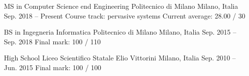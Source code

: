 

\begin{cventries}

\cventry
    {MS in Computer Science end Engineering}
    {Politecnico di Milano}
    {Milano, Italia}
    {Sep. 2018 -- Present}
    {Course track: pervasive systems {\enskip\cdotp\enskip} Current average: 28.00 / 30}
    
\cventry
    {BS in Ingegneria Informatica}
    {Politecnico di Milano}
    {Milano, Italia}
    {Sep. 2015 -- Sep. 2018}
    {Final mark: 100 / 110}
    
\cventry
    {High School}
    {Liceo Scientifico Statale Elio Vittorini}
    {Milano, Italia}
    {Sep. 2010 -- Jun. 2015}
    {Final mark: 100 / 100}
\end{cventries}

